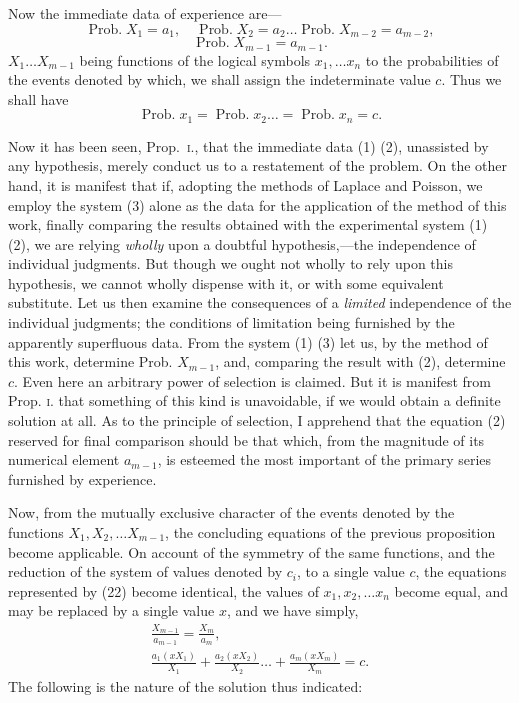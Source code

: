 \documentclass[oneside]{book}
\begin{document}
Now the immediate data of experience are---
\begin{equation}\tag{1}
\operatorname{Prob. } X_1 = a_1, \quad
\operatorname{Prob. } X_2 = a_2\dotsc
\operatorname{Prob. } X_{m-2} = a_{m-2},
\end{equation}
\begin{equation}\tag{2}
\operatorname{Prob. } X_{m-1} = a_{m-1}.
\end{equation}
$X_1\dots X_{m-1}$ being functions of the logical symbols
$x_1, \dotsc x_n$ to the
probabilities of the events denoted by which, we shall assign the
indeterminate value $c$. Thus we shall have
\begin{equation}\tag{3}
\operatorname{Prob. } x_1 = \operatorname{Prob. } x_2 \dots = \operatorname{Prob. } x_n = c.
\end{equation}

Now it has been seen, Prop.~\textsc{i}., that the immediate data (1)
(2), unassisted by any hypothesis, merely conduct us to a
restatement of the problem. On the other hand, it is manifest that
if, adopting the methods of Laplace and Poisson, we employ the
system (3) alone as the data for the application of the method of
this work, finally comparing the results obtained with the
experimental system (1) (2), we are relying \emph{wholly} upon a doubtful
hypothesis,---the independence of individual judgments. But
though we ought not wholly to rely upon this hypothesis, we
cannot wholly dispense with it, or with some equivalent substitute. Let us then examine the consequences of a \emph{limited} independence of the individual judgments; the conditions of limitation
being furnished by the apparently superfluous data. From the
system (1) (3) let us, by the method of this work, determine
Prob. $X_{m-1}$, and, comparing the result with (2), determine $c$.
Even here an arbitrary power of selection is claimed. But it is
manifest from Prop. \textsc{i.} that something of this kind is unavoidable,
if we would obtain a definite solution at all. As to the principle
of selection, I apprehend that the equation (2) reserved for final
comparison should be that which, from the magnitude of its numerical element $a_{m-1}$, is esteemed the most important of the primary series furnished by experience.

Now, from the mutually exclusive character of the events
denoted by the functions $X_1, X_2,\dotsc X_{m-1}$, the concluding equations of the previous proposition become applicable. On account
of the symmetry of the same functions, and the reduction of the
system of values denoted by $c_i$, to a single value $c$, the equations
represented by (22) become identical, the values of
$x_1, x_2,\dotsc x_n$
become equal, and may be replaced by a single value $x$, and we
have simply,
\begin{gather*}
  \frac{X_{m-1}}{a_{m-1}} = \frac{X_m}{a_m},   \tag{4}
\\
  \frac{a_1(x X_1)}{X_1}
+ \frac{a_2(x X_2)}{X_2} \dotsc
+ \frac{a_m(x X_m)}{X_m} = c.                  \tag{5}
\end{gather*}
The following is the nature of the solution thus indicated:
\end{document}
